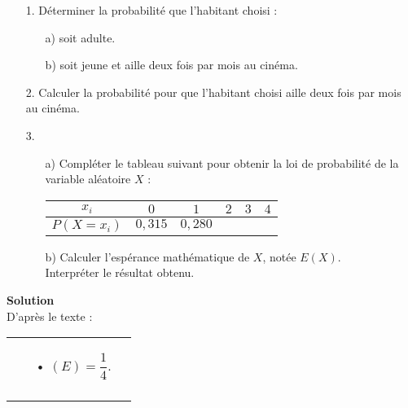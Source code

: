\begin{itemize}
\item[1.] Déterminer la probabilité que l'habitant choisi : \\
\begin{itemize}
\item[a)] soit adulte.
\item[b)] soit jeune et aille deux fois par mois au cinéma. \\
\end{itemize}
\item[2.] Calculer la probabilité pour que l'habitant choisi aille deux fois par mois au cinéma. \\
\item[3.]
\begin{itemize}
\item[a)] Compléter le tableau suivant pour obtenir la loi de probabilité de la variable aléatoire $X$ : \\

\begin{tabular}{|c|c|c|c|c|c|}
\hline
$x_i$ & $0$ & $1$ & $2$ & $3$ & $4$ \\
\hline
$P\left(X = x_i\right)$ & $0,315$ & $0,280$ & \hspace*{.3cm} & \hspace*{.3cm} & \hspace*{.3cm} \\
\hline
\end{tabular}

\vspace*{.5cm}

\item[b)] Calculer l'espérance mathématique de $X$, notée $E\left(X\right)$. \\ Interpréter le résultat obtenu.

\end{itemize}
\end{itemize}

\newpage

\vspace*{-1.5cm}

\textbf{Solution} \\

D'après le texte : \\

\begin{tabular}{ll}
\begin{minipage}{6cm}
\begin{itemize}
\item[•] $\left(E\right) = \dfrac{1}{4}$.
\end{itemize}
\end{minipage}
&
\begin{minipage}{5cm}
\begin{itemize}
\item[•] $p\left(J\right) = \dfrac{1}{5}$. \\
\end{itemize}
\end{minipage}
\end{tabular}

